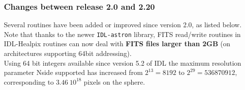 \documentclass[12pt,twoside]{article}
\begin{document}
\subsubsection{Changes between release 2.0 and 2.20}
Several routines have been added or improved since version 2.0, as listed below.
Note that thanks to the newer {\tt IDL-astron} library, FITS read/write routines
in IDL-Healpix routines can now deal with {\bf FITS files larger than 2GB} (on architectures supporting 64bit
addressing).\\
Using 64 bit integers available since version 5.2 of IDL the maximum resolution parameter Nside supported has increased
from $2^{13}=8192$ to $2^{29}=536870912$, corresponding to $3.46\ 10^{18}$
pixels on the sphere.

\end{document}
